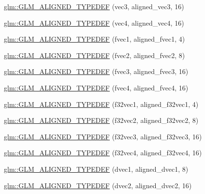\begin{DoxyCompactItemize}
\item 
\hyperlink{group__gtx__type__aligned_gab8d081fac3a38d6f55fa552f32168d32}{glm\-::\-G\-L\-M\-\_\-\-A\-L\-I\-G\-N\-E\-D\-\_\-\-T\-Y\-P\-E\-D\-E\-F} (vec3, aligned\-\_\-vec3, 16)
\item 
\hyperlink{group__gtx__type__aligned_ga12fe7b9769c964c5b48dcfd8b7f40198}{glm\-::\-G\-L\-M\-\_\-\-A\-L\-I\-G\-N\-E\-D\-\_\-\-T\-Y\-P\-E\-D\-E\-F} (vec4, aligned\-\_\-vec4, 16)
\item 
\hyperlink{group__gtx__type__aligned_gaefab04611c7f8fe1fd9be3071efea6cc}{glm\-::\-G\-L\-M\-\_\-\-A\-L\-I\-G\-N\-E\-D\-\_\-\-T\-Y\-P\-E\-D\-E\-F} (fvec1, aligned\-\_\-fvec1, 4)
\item 
\hyperlink{group__gtx__type__aligned_ga2543c05ba19b3bd19d45b1227390c5b4}{glm\-::\-G\-L\-M\-\_\-\-A\-L\-I\-G\-N\-E\-D\-\_\-\-T\-Y\-P\-E\-D\-E\-F} (fvec2, aligned\-\_\-fvec2, 8)
\item 
\hyperlink{group__gtx__type__aligned_ga009afd727fd657ef33a18754d6d28f60}{glm\-::\-G\-L\-M\-\_\-\-A\-L\-I\-G\-N\-E\-D\-\_\-\-T\-Y\-P\-E\-D\-E\-F} (fvec3, aligned\-\_\-fvec3, 16)
\item 
\hyperlink{group__gtx__type__aligned_ga2f26177e74bfb301a3d0e02ec3c3ef53}{glm\-::\-G\-L\-M\-\_\-\-A\-L\-I\-G\-N\-E\-D\-\_\-\-T\-Y\-P\-E\-D\-E\-F} (fvec4, aligned\-\_\-fvec4, 16)
\item 
\hyperlink{group__gtx__type__aligned_ga309f495a1d6b75ddf195b674b65cb1e4}{glm\-::\-G\-L\-M\-\_\-\-A\-L\-I\-G\-N\-E\-D\-\_\-\-T\-Y\-P\-E\-D\-E\-F} (f32vec1, aligned\-\_\-f32vec1, 4)
\item 
\hyperlink{group__gtx__type__aligned_ga5e185865a2217d0cd47187644683a8c3}{glm\-::\-G\-L\-M\-\_\-\-A\-L\-I\-G\-N\-E\-D\-\_\-\-T\-Y\-P\-E\-D\-E\-F} (f32vec2, aligned\-\_\-f32vec2, 8)
\item 
\hyperlink{group__gtx__type__aligned_gade4458b27b039b9ca34f8ec049f3115a}{glm\-::\-G\-L\-M\-\_\-\-A\-L\-I\-G\-N\-E\-D\-\_\-\-T\-Y\-P\-E\-D\-E\-F} (f32vec3, aligned\-\_\-f32vec3, 16)
\item 
\hyperlink{group__gtx__type__aligned_ga2e8a12c5e6a9c4ae4ddaeda1d1cffe3b}{glm\-::\-G\-L\-M\-\_\-\-A\-L\-I\-G\-N\-E\-D\-\_\-\-T\-Y\-P\-E\-D\-E\-F} (f32vec4, aligned\-\_\-f32vec4, 16)
\item 
\hyperlink{group__gtx__type__aligned_ga3e0f35fa0c626285a8bad41707e7316c}{glm\-::\-G\-L\-M\-\_\-\-A\-L\-I\-G\-N\-E\-D\-\_\-\-T\-Y\-P\-E\-D\-E\-F} (dvec1, aligned\-\_\-dvec1, 8)
\item 
\hyperlink{group__gtx__type__aligned_ga78bfec2f185d1d365ea0a9ef1e3d45b8}{glm\-::\-G\-L\-M\-\_\-\-A\-L\-I\-G\-N\-E\-D\-\_\-\-T\-Y\-P\-E\-D\-E\-F} (dvec2, aligned\-\_\-dvec2, 16)

\end{DoxyCompactItemize}

